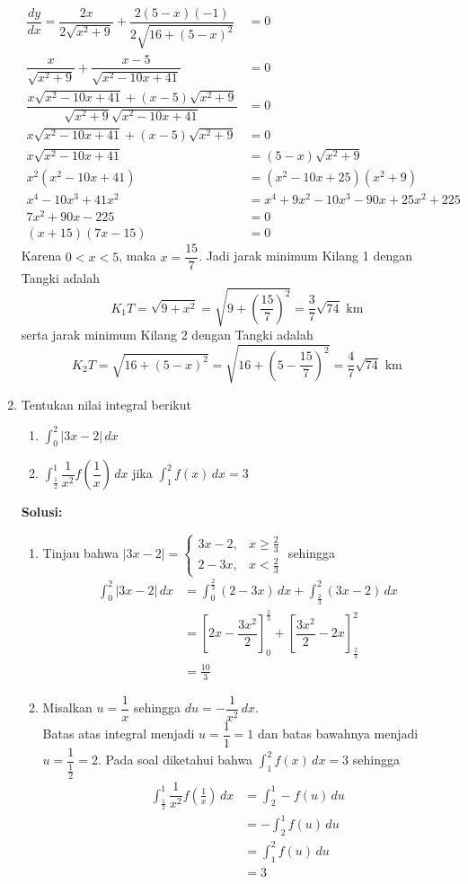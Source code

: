 \documentclass{article}
\begin{document}
\begin{enumerate}
	\begin{align*}
	\dfrac{dy}{dx} = \dfrac{2x}{2\sqrt{x^2+9}} + \dfrac{2(5-x)(-1)}{2\sqrt{16+(5-x)^2}} &= 0\\
	\dfrac{x}{\sqrt{x^2+9}}+\dfrac{x-5}{\sqrt{x^2-10x+41}} &= 0 \\
	\dfrac{x\sqrt{x^2-10x+41}+(x-5)\sqrt{x^2+9}}{\sqrt{x^2+9}\sqrt{x^2-10x+41}} &= 0\\
	x\sqrt{x^2-10x+41}+(x-5)\sqrt{x^2+9} &= 0\\
	x\sqrt{x^2-10x+41} &= (5-x)\sqrt{x^2+9} \\
	x^2(x^2-10x+41) &= (x^2-10x+25)(x^2+9)\\
	x^4-10x^3+41x^2 &= x^4+9x^2-10x^3-90x+25x^2+225 \\
	7x^2+90x-225 &= 0\\
	(x+15)(7x-15) &= 0 
	\end{align*}
	Karena $0<x<5$, maka $x=\dfrac{15}{7}$. Jadi jarak minimum Kilang 1 dengan Tangki adalah $$K_1T=\sqrt{9+x^2}=\sqrt{9+\left(\frac{15}{7}\right)^2}=\dfrac{3}{7}\sqrt{74} \text{ km}$$
	serta jarak minimum Kilang 2 dengan Tangki adalah $$K_2T=\sqrt{16+(5-x)^2} = \sqrt{16+\left(5-\frac{15}{7}\right)^2} = \dfrac{4}{7}\sqrt{74} \text{ km}$$
	\item Tentukan nilai integral berikut
	\begin{enumerate}
		\item $\displaystyle \int_0^2 |3x-2| \, dx$
		\item $\displaystyle \int_{\frac{1}{2}}^1 \dfrac{1}{x^2}f\left(\dfrac{1}{x}\right) \, dx$ jika $\displaystyle \int_1^2 f(x) \, dx =3$
	\end{enumerate}
	\textbf{Solusi:}
	\begin{enumerate}
		\item Tinjau bahwa $|3x-2| = \begin{cases} 3x-2, &x\geq\frac{2}{3}\\
		2-3x, &x<\frac{2}{3} \end{cases}$ sehingga 
		\begin{align*}
		\int_0^2 |3x-2| \, dx &= \int_0^{\frac{2}{3}} (2-3x) \, dx + \int_{\frac{2}{3}}^2 (3x-2) \, dx \\
		&= \left[2x-\dfrac{3x^2}{2}\right]^{\frac{2}{3}}_0 + \left[\dfrac{3x^2}{2}-2x\right]_{\frac{2}{3}}^2\\
		&= \frac{10}{3}
		\end{align*}
		\item Misalkan $u = \dfrac{1}{x}$ sehingga $du = -\dfrac{1}{x^2} \, dx$. \\Batas atas integral menjadi $u=\dfrac{1}{1}=1$ dan batas bawahnya menjadi $u=\dfrac{1}{\frac{1}{2}}=2$. Pada soal diketahui bahwa $\displaystyle \int_1^2 f(x)\, dx =3$ sehingga 
		\begin{align*}
		\int_{\frac{1}{2}}^1 \dfrac{1}{x^2}f\left(\frac{1}{x}\right) \, dx &= \int_2^1 -f(u) \, du\\
		&= -\int_2^1 f(u) \,du\\
		&= \int_1^2 f(u) \, du \\
		&= 3
		\end{align*}
	\end{enumerate}
\end{enumerate}
\end{document}
